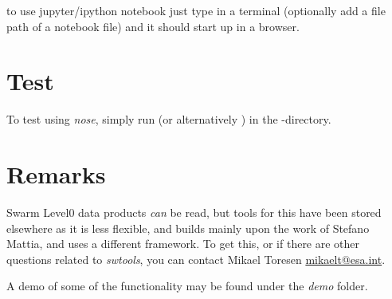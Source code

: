 \documentclass[letterpaper,10pt,english]{sphinxhowto}
\begin{document}
to use jupyter/ipython notebook just type  in a terminal (optionally add a file path of a notebook file) and it should start up in a browser.


\section{Test}
\label{test::doc}\label{test:test}\label{test:id1}
To test  using \emph{nose}, simply run  (or alternatively  ) in the -directory.


\section{Remarks}
\label{remarks::doc}\label{remarks:remarks}
Swarm Level0 data products \emph{can} be read, but tools for this have been stored elsewhere as it is less flexible, and builds mainly upon the work of Stefano Mattia, and uses a different framework. To get this, or if there are other questions related to \emph{swtools}, you can contact Mikael Toresen \href{mailto:mikaelt@esa.int}{mikaelt@esa.int}.

A demo of some of the functionality may be found under the \emph{demo} folder.



\renewcommand{\indexname}{Index}
\printindex
\end{document}
